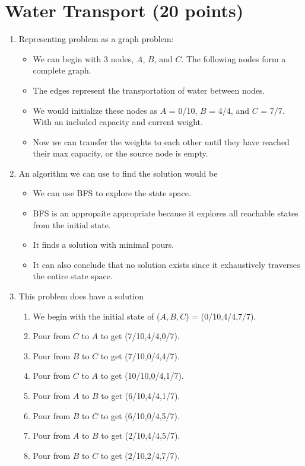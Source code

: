 \documentclass{article}[12pt]
\begin{document}
\section{Water Transport (20 points)}
\begin{enumerate}
  \item Representing problem as a graph problem: 
    \begin{itemize}
      \item We can begin with 3 nodes, $A$, $B$, and $C$. The following nodes form a complete graph.
      \item The edges represent the transportation of water between nodes.
      \item We would initialize these nodes as $A$ = 0/10, $B$ = 4/4, and $C$ = 7/7.
        With an included capacity and current weight.
      \item Now we can transfer the weights to each other until they have reached their max capacity, or the source node is empty.
    \end{itemize}
  \item An algorithm we can use to find the solution would be
    \begin{itemize}
      \item We can use BFS to explore the state space.
      \item BFS is an appropaite appropriate because it explores all reachable states from the initial state.
      \item It finds a solution with minimal pours.
      \item It can also conclude that no solution exists since it exhaustively traverses the entire state space.
    \end{itemize}
    \item This problem does have a solution
      \begin{enumerate}
        \item We begin with the initial state of ($A,B,C$) = (0/10,4/4,7/7).
        \item Pour from $C$ to $A$ to get (7/10,4/4,0/7).
        \item Pour from $B$ to $C$ to get (7/10,0/4,4/7).
        \item Pour from $C$ to $A$ to get (10/10,0/4,1/7).
        \item Pour from $A$ to $B$ to get (6/10,4/4,1/7).
        \item Pour from $B$ to $C$ to get (6/10,0/4,5/7). %
        \item Pour from $A$ to $B$ to get (2/10,4/4,5/7).
        \item Pour from $B$ to $C$ to get (2/10,2/4,7/7).
      \end{enumerate}
\end{enumerate}
\end{document}
